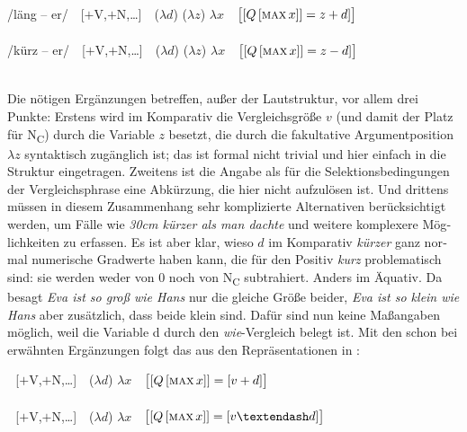 \documentclass[output=paper,colorlinks,citecolor=brown]{langscibook}
\begin{document}
\begin{otherlanguage}{german}
\ea
\ea\gll 
{/läng -- er/} \,\, [$+$V,$+$N,\dots] \,\, ($\lambda d$) ($\lambda z$) {$\lambda x$} \,\, {$\big\lbrack [ Q\, [\textsc{max}\, x ]] = z + d ] \big\rbrack$} \\
{} {} {} {} {} \phantom{(}{\small als} {} {} {} {} \\ 
\ex\gll 
{/kürz -- er/} \,\, [$+$V,$+$N,\dots] \,\, ($\lambda d$) ($\lambda z$) {$\lambda x$} \,\, {$\big\lbrack [ Q\, [\textsc{max}\, x ]] = z - d ] \big\rbrack$} \\
{} {} {} {} {} \phantom{(}{\small als} {} {} {} {} \\ 
\z
\label{ex:19}
\z 

\noindent Die nötigen Ergänzungen betreffen, außer der Lautstruktur, vor allem drei Punkte: Erstens wird im Komparativ die Vergleichsgröße $v$ (und damit der Platz für N\textsubscript{C}) durch die Variable $z$ besetzt, die durch die fakultative Argumentposition $\lambda z$ syntaktisch zugänglich ist; das ist formal nicht trivial und hier einfach in die Struktur eingetragen. Zweitens ist die Angabe \glq als\grq{} für die Selektionsbedingungen der Vergleichsphrase eine Abkürzung, die hier nicht aufzulösen ist. Und drittens müssen in diesem Zusammenhang sehr komplizierte Alternativen berücksichtigt werden, um Fälle wie \textit{30cm kürzer als man dachte} und weitere komplexere Möglichkeiten zu erfassen. Es ist aber klar, wieso $d$ im Komparativ \textit{kürzer} ganz normal numerische Gradwerte haben kann, die für den Positiv \textit{kurz} problematisch sind: sie werden weder von 0 noch von N\textsubscript{C} subtrahiert. Anders im Äquativ. Da besagt \textit{Eva ist so groß wie Hans} nur die gleiche Größe beider, \textit{Eva ist so klein wie Hans} aber zusätzlich, dass beide klein sind. Dafür sind nun keine Maßangaben möglich, weil die Variable d durch den \textit{wie}-Vergleich belegt ist. Mit den schon bei  erwähnten Ergänzungen folgt das aus den Repräsentationen in :

\ea
\ea{} \,\, [$+$V,$+$N,\dots] \,\, {($\lambda d$)} {$\lambda x$} \,\, {$\big\lbrack [ Q\, [ \textsc{max}\, x ] ] = [ v + d ] \big\rbrack$} \\
{} {} {} {} \phantom{(}{\small wie} {} {} {} \\ 
\ex{} \,\, [$+$V,$+$N,\dots] \,\, {($\lambda d$)} {$\lambda x$} \,\, {$\big\lbrack [ Q\, [ \textsc{max}\, x ] ] = [ v – d ] \big\rbrack$} \\
{} {} {} {} \phantom{(}{\small wie} {} {} {} \\ 
\z
\label{ex:20}
\z 


\end{otherlanguage}
\end{document}

